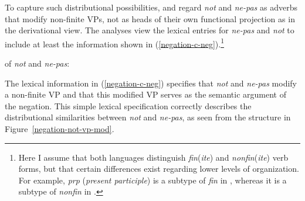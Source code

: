 \documentclass[output=paper
 	        ,biblatex
                ,babelshorthands
                ,newtxmath
                ,draftmode
                ,colorlinks, citecolor=brown
]{langscibook}
\begin{document}
\begin{exe}
\begin{xlist}
\begin{exe}
\begin{xlist}
\noindent
To capture such distributional possibilities, \citet{Kim:00} and \citet{KS:02} regard \textit{not} and \textit{ne-pas} as adverbs that modify
non-finite VPs, not as  heads of their own functional projection as in the derivational view. The
analyses view the lexical entries for \textit{ne-pas} and \textit{not} to include at
least the
information shown in (\ref{negation-c-neg}).\footnote{Here I assume that both languages
distinguish \textit{fin}(\textit{ite}) and \textit{nonfin}(\textit{ite}) verb forms, but that
certain differences exist regarding lower levels of organization. For example,
\textit{prp} (\textit{present participle}) is a subtype of \textit{fin} in ,
whereas it is a subtype of \textit{nonfin} in .}


\ea
\label{negation-c-neg}
\localvs of \emph{not} and \emph{ne-pas}:\\
\z

\noindent %
The lexical information in (\ref{negation-c-neg}) specifies that
\textit{not} and \textit{ne-pas} modify a non-finite VP and that this
modified VP serves as the semantic argument of the negation.
This simple lexical specification correctly describes the
distributional similarities between  \textit{not} and 
\textit{ne-pas}, as seen from the structure in Figure~\ref{negation-not-vp-mod}.


\end{xlist}
\end{exe}
\end{xlist}
\end{exe}
\end{document}
